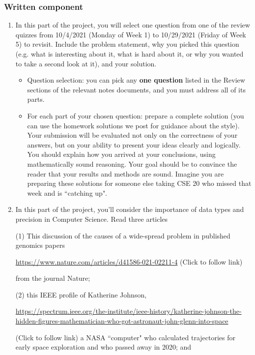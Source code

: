 \subsubsection*{Written component}
\begin{enumerate}
\item In this part of the project, you will select one question from one of the review quizzes 
from 10/4/2021 (Monday of Week 1) to 10/29/2021 (Friday of Week 5) to revisit. 
Include the problem statement, why you picked this question (e.g. what is interesting about it, 
what is hard about it, or why you wanted to take a second look at it), and your solution. 
    \begin{itemize}
        \item Question selection: you can pick any {\bf one question} listed in the Review 
        sections of the relevant notes documents, and you must address all of its parts.
        \item For each part of your chosen question: prepare a complete solution 
        (you can use the homework solutions we post for guidance about the style). 
        Your submission will be evaluated not only on the correctness of your answers, 
        but on your ability to present your ideas clearly and logically. 
        You should explain how you arrived at your conclusions, using mathematically 
        sound reasoning. Your goal should be to convince the reader that your results 
        and methods are sound. Imagine you are preparing these solutions for someone else 
        taking CSE 20 who missed that week and is ``catching up".
    \end{itemize}
\item In this part of the project, you'll consider the importance of data types
and precision in Computer Science. 
Read three articles

(1) This discussion of the causes of a wide-spread problem in published genomics papers

\url{https://www.nature.com/articles/d41586-021-02211-4} (Click to follow link)

from the journal Nature; 

(2) this IEEE profile of Katherine Johnson, 

{\tiny \url{https://spectrum.ieee.org/the-institute/ieee-history/katherine-johnson-the-hidden-figures-mathematician-who-got-astronaut-john-glenn-into-space}}

(Click to follow link) a NASA ``computer" who calculated trajectories for 
early space exploration and who passed away in 2020; and 


\end{enumerate}
